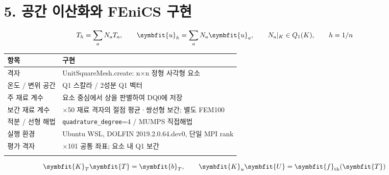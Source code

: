 \documentclass[10pt,a4paper]{article}
\renewcommand{\boldsymbol}[1]{\symbfit{#1}}
\begin{document}
\clearpage

\section{5. 공간 이산화와 FEniCS 구현}

\begin{equation}T_h=\sum_a N_a T_a,\qquad\boldsymbol u_h=\sum_a N_a\boldsymbol u_a,\qquad N_a|_K\in Q_1(K),\qquad h=1/n\end{equation}

\begingroup\small

\par\begin{minipage}{\linewidth}\begin{tabular}{>{\raggedright\arraybackslash}p{}>{\raggedright\arraybackslash}p{}}

\rowcolor{tint} \textbf{항목} & \textbf{구현}\\\midrule

격자 & UnitSquareMesh.create: n$\times$n 정형 사각형 요소\\\addlinespace[2pt]

온도 / 변위 공간 & Q1 스칼라 / 2성분 Q1 벡터\\\addlinespace[2pt]

주 재료 계수 & 요소 중심에서 상을 판별하여 DQ0에 저장\\\addlinespace[2pt]

보간 재료 계수 & 50$\times$50 재료 격자의 절점 평균·쌍선형 보간; 별도 FEM100\\\addlinespace[2pt]

적분 / 선형 해법 & \nolinkurl{quadrature_degree}=4 / MUMPS 직접해법\\\addlinespace[2pt]

실행 환경 & Ubuntu WSL, DOLFIN 2019.2.0.64.dev0, 단일 MPI rank\\\addlinespace[2pt]

평가 격자 & 101$\times$101 공통 좌표; 요소 내 Q1 보간\\\addlinespace[2pt]

\bottomrule\end{tabular}\end{minipage}\par\vspace{5pt}\endgroup

\begin{equation}\boldsymbol K_T\boldsymbol T=\boldsymbol b_T,\qquad\boldsymbol K_u\boldsymbol U=\boldsymbol f_{\mathrm{th}}(\boldsymbol T)\end{equation}
\end{document}
